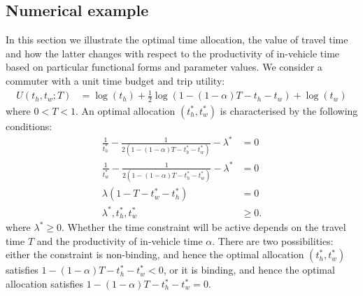 \documentclass[12pt,a4paper,british]{article}
\begin{document}
\subsection{Numerical example}

In this section we illustrate the optimal time allocation, the value of travel time and how the latter changes with respect to the productivity of in-vehicle time based on particular functional forms and parameter values. We consider a commuter with a unit time budget and trip utility:
\begin{align*}
U\left(t_{h},t_{w};T\right) & = \log\left(t_{h}\right) + \frac{1}{2} \log\left(1-\left(1-\alpha\right)T-t_{h}-t_{w}\right)+\log\left(t_{w}\right)
\end{align*}where $0<T<1$. An optimal allocation $\left(t_h^{\ast}, t_w^{\ast}\right)$ is characterised by the following conditions:
\begin{subequations}
	\label{eq:foc_example1}
	\begin{align}
	\frac{1}{t_{h}^{\ast}}-\frac{1}{2\left(1-\left(1-\alpha\right)T-t_{h}^{\ast}-t_{w}^{\ast}\right)}-\lambda^{\ast} & = 0 
	\label{eq:foc_eg1_th} \\
	\frac{1}{t_{w}^{\ast}} - \frac{1}{2\left(1-\left(1-\alpha\right)T - t_{h}^{\ast} - t_{w}^{\ast} \right)} - \lambda^{\ast} & = 0
	\label{eq:foc_eg1_tw}\\
	\lambda\left(1-T-t_{w}^{\ast}-t_{h}^{\ast}\right) & = 0 
	\label{eq:foc_eg1_lamb} \\
	\lambda^{\ast},t_{h}^{\ast},t_{w}^{\ast} & \geq 0.
	\label{eq:foc_eg1_nonnega}
	\end{align}
\end{subequations}
where $\lambda^{\ast} \geq 0$. Whether the time constraint will be active depends on the travel time $T$ and the productivity of in-vehicle time $\alpha$. There are two possibilities: either the constraint is non-binding, and hence the optimal allocation $\left(t_h^{\ast}, t_w^{\ast}\right)$ satisfies $1-(1-\alpha)T - t_h^{\ast} - t_w^{\ast} < 0$, or it is binding, and hence the optimal allocation satisfies $1-(1-\alpha)T - t_h^{\ast} - t_w^{\ast} = 0$. 
\end{document}
